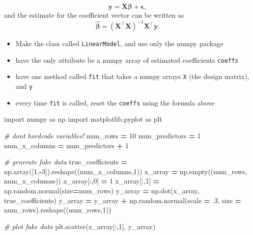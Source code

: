 \documentclass[
  12pt,
]{krantz}
\makeatletter
\newenvironment{Shaded}{\begin{snugshade}}{\end{snugshade}}
\newcommand{\CommentTok}[1]{\textcolor[rgb]{0.37,0.37,0.37}{\textit{#1}}}
\newcommand{\DecValTok}[1]{\textcolor[rgb]{0.06,0.06,0.06}{#1}}
\newcommand{\FloatTok}[1]{\textcolor[rgb]{0.06,0.06,0.06}{#1}}
\newcommand{\ImportTok}[1]{#1}
\newcommand{\NormalTok}[1]{#1}
\newcommand{\OperatorTok}[1]{\textcolor[rgb]{0.43,0.43,0.43}{\textbf{#1}}}
\providecommand{\tightlist}{%
  \setlength{\itemsep}{0pt}\setlength{\parskip}{0pt}}
\newenvironment{kframe}{%
\medskip{}
\setlength{\fboxsep}{.8em}
 \def\at@end@of@kframe{}%
 \ifinner\ifhmode%
  \def\at@end@of@kframe{\end{minipage}}%
  \begin{minipage}{\columnwidth}%
 \fi\fi%
 \def\FrameCommand##1{\hskip\@totalleftmargin \hskip-\fboxsep
 \colorbox{shadecolor}{##1}\hskip-\fboxsep
     \hskip-\linewidth \hskip-\@totalleftmargin \hskip\columnwidth}%
 \MakeFramed {\advance\hsize-\width
   \@totalleftmargin\z@ \linewidth\hsize
   \@setminipage}}%
 {\par\unskip\endMakeFramed%
 \at@end@of@kframe}
\renewenvironment{Shaded}{\begin{kframe}}{\end{kframe}}
\makeatother
\begin{document}
\[
\mathbf{y} = 
\mathbf{X}\boldsymbol{\beta} + \boldsymbol{\epsilon},
\]
and the estimate for the coefficient vector can be written as
\[
\hat{\boldsymbol{\beta}} = \left(\mathbf{X}^\intercal \mathbf{X} \right)^{-1}\mathbf{X}^\intercal \mathbf{y}.
\]

\begin{itemize}
\tightlist
\item
  Make the class called \texttt{LinearModel}, and use only the numpy package
\item
  have the only attribute be a numpy array of estimated coefficients \texttt{coeffs}
\item
  have one method called \texttt{fit} that takes a numpy arrays \texttt{X} (the design matrix), and \texttt{y}
\item
  every time \texttt{fit} is called, reset the \texttt{coeffs} using the formula above
\end{itemize}

\begin{Shaded}
\begin{Highlighting}[]
\ImportTok{import}\NormalTok{ numpy }\ImportTok{as}\NormalTok{ np}
\ImportTok{import}\NormalTok{ matplotlib.pyplot }\ImportTok{as}\NormalTok{ plt}

\CommentTok{\# don\textquotesingle{}t hardcode variables!}
\NormalTok{num\_rows }\OperatorTok{=} \DecValTok{10}
\NormalTok{num\_predictors }\OperatorTok{=} \DecValTok{1}
\NormalTok{num\_x\_columns }\OperatorTok{=}\NormalTok{ num\_predictors }\OperatorTok{+} \DecValTok{1}

\CommentTok{\# generate fake data }
\NormalTok{true\_coefficients }\OperatorTok{=}\NormalTok{ np.array([}\DecValTok{1}\NormalTok{,}\OperatorTok{{-}}\DecValTok{3}\NormalTok{]).reshape((num\_x\_columns,}\DecValTok{1}\NormalTok{))}
\NormalTok{x\_array }\OperatorTok{=}\NormalTok{ np.empty((num\_rows, num\_x\_columns))}
\NormalTok{x\_array[:,}\DecValTok{0}\NormalTok{] }\OperatorTok{=} \DecValTok{1}
\NormalTok{x\_array[:,}\DecValTok{1}\NormalTok{] }\OperatorTok{=}\NormalTok{ np.random.normal(size}\OperatorTok{=}\NormalTok{num\_rows)}
\NormalTok{y\_array }\OperatorTok{=}\NormalTok{ np.dot(x\_array, true\_coefficients) }
\NormalTok{y\_array }\OperatorTok{=}\NormalTok{ y\_array }\OperatorTok{+}\NormalTok{ np.random.normal(scale }\OperatorTok{=} \FloatTok{.3}\NormalTok{, size }\OperatorTok{=}\NormalTok{ num\_rows).reshape((num\_rows,}\DecValTok{1}\NormalTok{))}

\CommentTok{\# plot fake data }
\NormalTok{plt.scatter(x\_array[:,}\DecValTok{1}\NormalTok{], y\_array)}
\end{Highlighting}
\end{Shaded}
\end{document}
